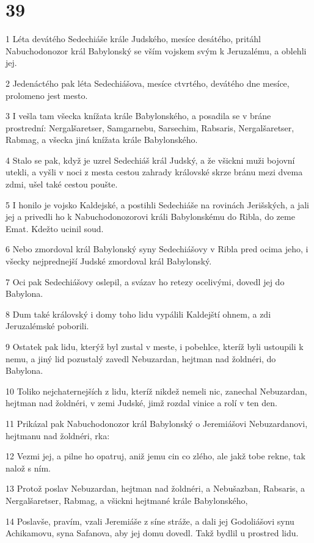 \chapter{39}

\par 1 Léta devátého Sedechiáše krále Judského, mesíce desátého, pritáhl Nabuchodonozor král Babylonský se vším vojskem svým k Jeruzalému, a oblehli jej.
\par 2 Jedenáctého pak léta Sedechiášova, mesíce ctvrtého, devátého dne mesíce, prolomeno jest mesto.
\par 3 I vešla tam všecka knížata krále Babylonského, a posadila se v bráne prostrední: Nergalšaretser, Samgarnebu, Sarsechim, Rabsaris, Nergalšaretser, Rabmag, a všecka jiná knížata krále Babylonského.
\par 4 Stalo se pak, když je uzrel Sedechiáš král Judský, a že všickni muži bojovní utekli, a vyšli v noci z mesta cestou zahrady královské skrze bránu mezi dvema zdmi, ušel také cestou poušte.
\par 5 I honilo je vojsko Kaldejské, a postihli Sedechiáše na rovinách Jerišských, a jali jej a privedli ho k Nabuchodonozorovi králi Babylonskému do Ribla, do zeme Emat. Kdežto ucinil soud.
\par 6 Nebo zmordoval král Babylonský syny Sedechiášovy v Ribla pred ocima jeho, i všecky nejprednejší Judské zmordoval král Babylonský.
\par 7 Oci pak Sedechiášovy oslepil, a svázav ho retezy ocelivými, dovedl jej do Babylona.
\par 8 Dum také královský i domy toho lidu vypálili Kaldejští ohnem, a zdi Jeruzalémské poborili.
\par 9 Ostatek pak lidu, kterýž byl zustal v meste, i pobehlce, kteríž byli ustoupili k nemu, a jiný lid pozustalý zavedl Nebuzardan, hejtman nad žoldnéri, do Babylona.
\par 10 Toliko nejchaternejších z lidu, kteríž nikdež nemeli nic, zanechal Nebuzardan, hejtman nad žoldnéri, v zemi Judské, jimž rozdal vinice a rolí v ten den.
\par 11 Prikázal pak Nabuchodonozor král Babylonský o Jeremiášovi Nebuzardanovi, hejtmanu nad žoldnéri, rka:
\par 12 Vezmi jej, a pilne ho opatruj, aniž jemu cin co zlého, ale jakž tobe rekne, tak nalož s ním.
\par 13 Protož poslav Nebuzardan, hejtman nad žoldnéri, a Nebušazban, Rabsaris, a Nergalšaretser, Rabmag, a všickni hejtmané krále Babylonského,
\par 14 Poslavše, pravím, vzali Jeremiáše z síne stráže, a dali jej Godoliášovi synu Achikamovu, syna Safanova, aby jej domu dovedl. Takž bydlil u prostred lidu.
